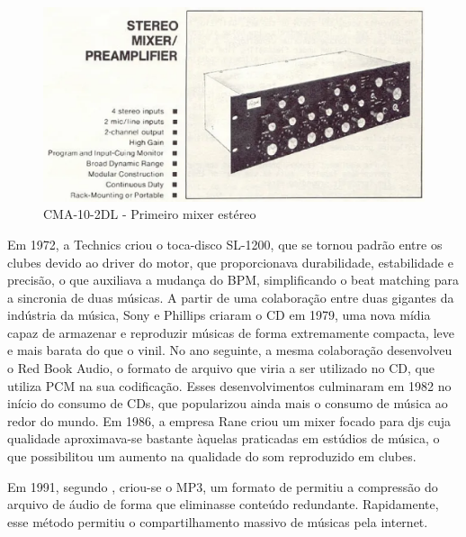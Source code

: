 \begin{figure}[h]
	\centering
    \includegraphics[scale=0.6]{figuras/fig10.eps}
	\caption{CMA-10-2DL - Primeiro mixer estéreo}
	\label{fig10}
\end{figure}
\par
\par
Em 1972, a Technics criou o toca-disco SL-1200, que se tornou padrão entre os clubes devido ao driver do motor, que proporcionava durabilidade, estabilidade e precisão, o que auxiliava a mudança do BPM, simplificando o beat matching para a sincronia de duas músicas.
A partir de uma colaboração entre duas gigantes da indústria da música, Sony e Phillips criaram o CD em 1979, uma nova mídia capaz de armazenar e reproduzir músicas de forma extremamente compacta, leve e mais barata do que o vinil. No ano seguinte, a mesma colaboração desenvolveu o Red Book Audio, o formato de arquivo que viria a ser utilizado no CD, que utiliza PCM na sua codificação. Esses desenvolvimentos culminaram em 1982 no início do consumo de CDs, que popularizou ainda mais o consumo de música ao redor do mundo. Em 1986, a empresa Rane criou um mixer focado para djs cuja qualidade aproximava-se bastante àquelas praticadas em estúdios de música, o que possibilitou um aumento na qualidade do som reproduzido em clubes. 
\par
Em 1991, segundo \cite{lastnight}, criou-se o MP3, um formato de permitiu a compressão do arquivo de áudio de forma que eliminasse conteúdo redundante. Rapidamente, esse método permitiu o compartilhamento massivo de músicas pela internet.
